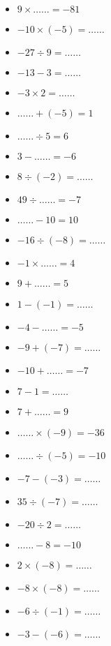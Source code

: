 \begin{multicols}{3}\noindent
  \begin{itemize}[label={$\bullet$}]
    \item $9 \times \ldots\ldots = -81$
    \item $-10 \times \left( -5\right) = \ldots\ldots$
    \item $-27 \div 9 = \ldots\ldots$
    \item $-13 - 3 = \ldots\ldots$
    \item $-3 \times 2 = \ldots\ldots$
    \item $\ldots\ldots + \left( -5\right) = 1$
    \item $\ldots\ldots \div 5 = 6$
    \item $3 - \ldots\ldots = -6$
    \item $8 \div \left( -2\right) = \ldots\ldots$
    \item $49 \div \ldots\ldots = -7$
    \item $\ldots\ldots - 10 = 10$
    \item $-16 \div \left( -8\right) = \ldots\ldots$
    \item $-1 \times \ldots\ldots = 4$
    \item $9 + \ldots\ldots = 5$
    \item $1 - \left( -1\right) = \ldots\ldots$
    \item $-4 - \ldots\ldots = -5$
    \item $-9 + \left( -7\right) = \ldots\ldots$
    \item $-10 + \ldots\ldots = -7$
    \item $7 - 1 = \ldots\ldots$
    \item $7 + \ldots\ldots = 9$
    \item $\ldots\ldots \times \left( -9\right) = -36$
    \item $\ldots\ldots \div \left( -5\right) = -10$
    \item $-7 - \left( -3\right) = \ldots\ldots$
    \item $35 \div \left( -7\right) = \ldots\ldots$
    \item $-20 \div 2 = \ldots\ldots$
    \item $\ldots\ldots - 8 = -10$
    \item $2 \times \left( -8\right) = \ldots\ldots$
    \item $-8 \times \left( -8\right) = \ldots\ldots$
    \item $-6 \div \left( -1\right) = \ldots\ldots$
    \item $-3 - \left( -6\right) = \ldots\ldots$
   \end{itemize}
\end{multicols}

